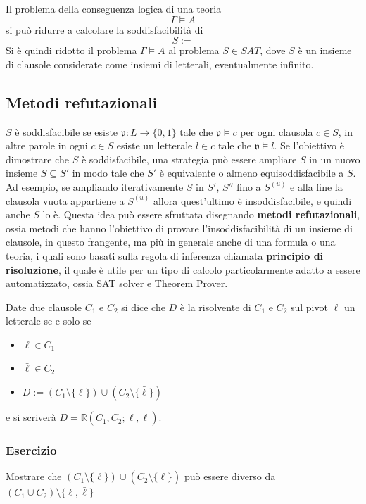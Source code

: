 Il problema della conseguenza logica di una teoria 
$$
\Gamma \models A
$$
si può ridurre a calcolare la soddisfacibilità di 
$$
S := 
$$
Si è quindi ridotto il problema $\Gamma \models A$ al problema $S \in SAT$,
dove $S$ è un insieme di clausole considerate come insiemi di letterali, 
eventualmente infinito. 


\subsection{Metodi refutazionali}
$S$ è soddisfacibile se esiste $\mathfrak{v}:L \rightarrow \{0,1\}$ tale 
che $\mathfrak{v} \models c$ per ogni clausola $c \in S$, in altre parole 
in ogni $c \in S$ esiste un letterale $l \in c$ tale che $\mathfrak{v} \models l$. 
Se l'obiettivo è dimostrare che $S$ è soddisfacibile, una strategia 
può essere ampliare $S$ in un nuovo insieme $S \subseteq S'$ in modo 
tale che $S'$ è equivalente o almeno equisoddisfacibile a $S$.
Ad esempio, se ampliando iterativamente $S$ in $S'$, $S''$ fino a $S^{(u)}$ 
e alla fine la clausola vuota appartiene a $S^{(u)}$ allora quest'ultimo 
è insoddisfacibile, e quindi anche $S$ lo è. Questa idea può essere sfruttata 
disegnando \textbf{metodi refutazionali}, ossia metodi che hanno l'obiettivo di 
provare l'insoddisfacibilità di un insieme di clausole, in questo frangente, 
ma più in generale anche di una formula o una teoria, i quali sono basati 
sulla regola di inferenza chiamata \textbf{principio di risoluzione}, 
il quale è utile per un tipo di calcolo particolarmente adatto a essere automatizzato, 
ossia SAT solver e Theorem Prover. 

\begin{defi}
        Date due clausole $C_1$ e $C_2$ si dice che $D$ è la risolvente 
        di $C_1$ e $C_2$ sul pivot $\ell$ un letterale se e solo se
        \begin{itemize}
                \item $\ell \in C_1$
                \item $\bar{\ell} \in C_2$
                \item $D := (C_1 \setminus \{\ell\}) \cup (C_2 \setminus \{\bar{\ell}\})$
        \end{itemize}
       e si scriverà $D = \mathbb{R}(C_1,C_2; \ell, \bar{\ell})$. 
\end{defi}

\subsubsection{Esercizio}
Mostrare che $(C_1 \setminus \{\ell\}) \cup (C_2 \setminus \{\bar{\ell}\})$ può essere 
diverso da $(C_1 \cup C_2) \setminus \{\ell, \bar{\ell}\}$

